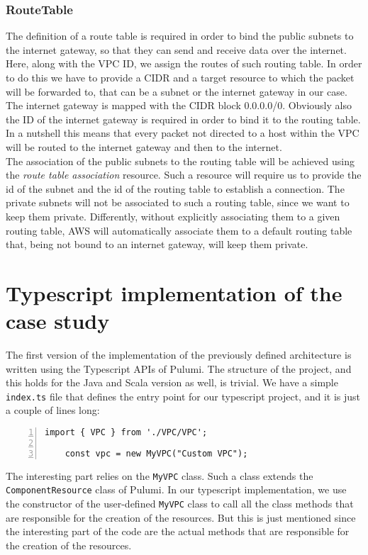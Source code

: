 \subsubsection{RouteTable}
\label{sssec:routetable}
The definition of a route table is required in order to bind the public subnets to the internet gateway, so that they can send and receive data over the internet.\\
Here, along with the VPC ID, we assign the routes of such routing table.
In order to do this we have to provide a CIDR and a target resource to which the packet will be forwarded to, that can be a subnet or the internet gateway in our case.
The internet gateway is mapped with the CIDR block 0.0.0.0/0.
Obviously also the ID of the internet gateway is required in order to bind it to the routing table.\\
In a nutshell this means that every packet not directed to a host within the VPC will be routed to the internet gateway and then to the internet.\\
The association of the public subnets to the routing table will be achieved using the \textit{route table association} resource.
Such a resource will require us to provide the id of the subnet and the id of the routing table to establish a connection.
The private subnets will not be associated to such a routing table, since we want to keep them private.
Differently, without explicitly associating them to a given routing table, AWS will automatically associate them to a default routing table that, being not bound to an internet gateway, will keep them private.\\


\section{Typescript implementation of the case study}
\label{sec:typescript-impl}
The first version of the implementation of the previously defined architecture is written using the Typescript APIs of Pulumi.
The structure of the project, and this holds for the Java and Scala version as well, is trivial.
We have a simple \texttt{index.ts} file that defines the entry point for our typescript project, and it is just a couple of lines long:\\
\begin{minipage}{\linewidth}
\begin{lstlisting}[numbers=left, numberstyle=\tiny, numbersep=-5pt, stepnumber=1]
    import { VPC } from './VPC/VPC';
  
    const vpc = new MyVPC("Custom VPC");
  \end{lstlisting}
\end{minipage}
The interesting part relies on the \texttt{MyVPC} class.
Such a class extends the \texttt{ComponentResource} class of Pulumi.
In our typescript implementation, we use the constructor of the user-defined \texttt{MyVPC} class to call all the class methods that are responsible for the creation of the resources.
But this is just mentioned since the interesting part of the code are the actual methods that are responsible for the creation of the resources.

